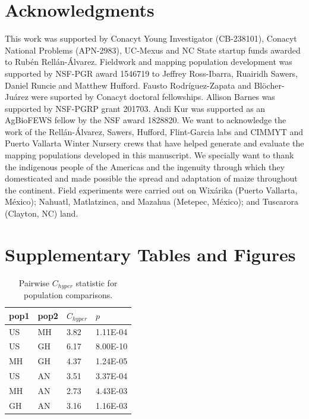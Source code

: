 \documentclass[9pt,twocolumn,twoside,lineno]{BioRxiv}
\begin{document}
\section{Acknowledgments}
This work was supported by Conacyt Young Investigator (CB-238101), Conacyt National Problems (APN-2983), UC-Mexus and NC State startup funds awarded to Rubén Rellán-Álvarez. 
Fieldwork and mapping population development was supported by NSF-PGR award 1546719 to Jeffrey Ross-Ibarra, Ruairidh Sawers, Daniel Runcie and Matthew Hufford.  
Fausto Rodríguez-Zapata and Blöcher-Juárez were suported by Conacyt doctoral fellowships.
Allison Barnes was supported by NSF-PGRP grant 201703. 
Andi Kur was supported as an AgBioFEWS fellow by the NSF award 1828820.
We want to acknowledge the work of the Rellán-Álvarez, Sawers, Hufford, Flint-Garcia labs and CIMMYT and Puerto Vallarta Winter Nursery crews that have helped generate and evaluate the mapping populations developed in this manuscript.
We specially want to thank the indigenous people of the Americas and the  ingenuity through which they domesticated and made possible the spread and adaptation of maize throughout the continent. 
Field experiments were carried out on Wixárika (Puerto Vallarta, México); Nahuatl, Matlatzinca, and Mazahua (Metepec, México); and Tuscarora (Clayton, NC) land.
\label{sec:acknowledgments}



\clearpage

\onecolumn

\section*{Supplementary Tables and Figures}

\begin{table}[h!]

\centering
\begin{tabular}{@{}llll@{}}
\toprule
pop1 & pop2 & $C_{hyper}$   & $p$  \\ \midrule
US   & MH   & 3.82 & 1.11E-04 \\
US   & GH   & 6.17 & 8.00E-10 \\
MH   & GH   & 4.37 & 1.24E-05 \\
US   & AN   & 3.51 & 3.37E-04 \\
MH   & AN   & 2.73 & 4.43E-03 \\
GH   & AN   & 3.16 & 1.16E-03 \\ \bottomrule
\end{tabular}
\label{tab:table1}
\caption{Pairwise $C_{hyper}$ statistic for population comparisons.}
\end{table}
\end{document}
